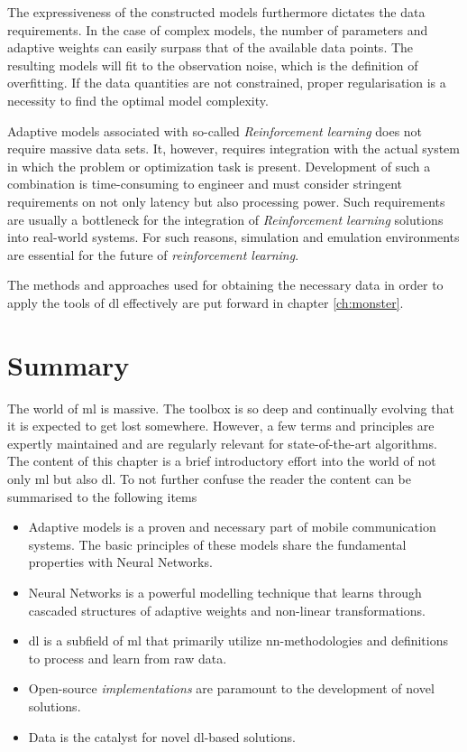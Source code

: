 The expressiveness of the constructed models furthermore dictates the data requirements. In the case of complex models, the number of parameters and adaptive weights can easily surpass that of the available data points. The resulting models will fit to the observation noise, which is the definition of overfitting. If the data quantities are not constrained, proper regularisation is a necessity to find the optimal model complexity. 

Adaptive models associated with so-called \emph{Reinforcement learning} does not require massive data sets. It, however, requires integration with the actual system in which the problem or optimization task is present. Development of such a combination is time-consuming to engineer and must consider stringent requirements on not only latency but also processing power. Such requirements are usually a bottleneck for the integration of \emph{Reinforcement learning} solutions into real-world systems. For such reasons, simulation and emulation environments are essential for the future of \emph{reinforcement learning}. 

The methods and approaches used for obtaining the necessary data in order to apply the tools of \gls{dl} effectively are put forward in chapter \ref{ch:monster}. 

\section{Summary}
The world of \gls{ml} is massive. The toolbox is so deep and continually evolving that it is expected to get lost somewhere. However, a few terms and principles are expertly maintained and are regularly relevant for state-of-the-art algorithms. The content of this chapter is a brief introductory effort into the world of not only \gls{ml} but also \gls{dl}. To not further confuse the reader the content can be summarised to the following items

\begin{itemize}
    \item Adaptive models is a proven and necessary part of mobile communication systems. The basic principles of these models share the fundamental properties with Neural Networks. 
    \item Neural Networks is a powerful modelling technique that learns through cascaded structures of adaptive weights and non-linear transformations.
    \item \gls{dl} is a subfield of \gls{ml} that primarily utilize \gls{nn}-methodologies and definitions to process and learn from raw data.
    \item Open-source \emph{implementations} are paramount to the development of novel solutions.
    \item Data is the catalyst for novel \gls{dl}-based solutions.
\end{itemize}